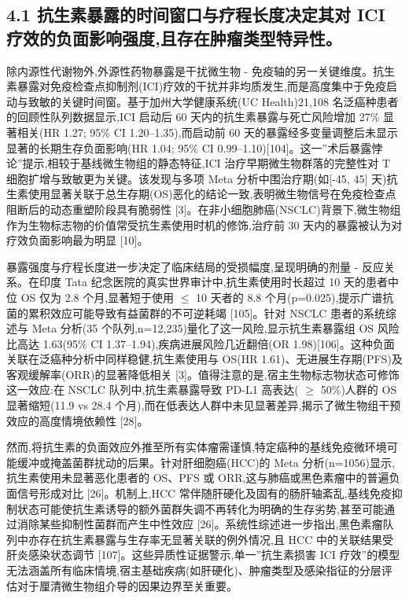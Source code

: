 \subsection{4.1 抗生素暴露的时间窗口与疗程长度决定其对 ICI 疗效的负面影响强度,且存在肿瘤类型特异性。}\label{ux6297ux751fux7d20ux66b4ux9732ux7684ux65f6ux95f4ux7a97ux53e3ux4e0eux7597ux7a0bux957fux5ea6ux51b3ux5b9aux5176ux5bf9-ici-ux7597ux6548ux7684ux8d1fux9762ux5f71ux54cdux5f3aux5ea6ux4e14ux5b58ux5728ux80bfux7624ux7c7bux578bux7279ux5f02ux6027}

除内源性代谢物外,外源性药物暴露是干扰微生物 - 免疫轴的另一关键维度。抗生素暴露对免疫检查点抑制剂(ICI)疗效的干扰并非均质发生,而是高度集中于免疫启动与致敏的关键时间窗。基于加州大学健康系统(UC Health)21,108 名泛癌种患者的回顾性队列数据显示,ICI 启动后 60 天内的抗生素暴露与死亡风险增加 27\% 显著相关(HR 1.27; 95\% CI 1.20--1.35),而启动前 60 天的暴露经多变量调整后未显示显著的长期生存负面影响(HR 1.04; 95\% CI 0.99--1.10){[}104{]}。这一''术后暴露悖论''提示,相较于基线微生物组的静态特征,ICI 治疗早期微生物群落的完整性对 T 细胞扩增与致敏更为关键。该发现与多项 Meta 分析中围治疗期(如{[}-45, 45{]} 天)抗生素使用显著关联于总生存期(OS)恶化的结论一致,表明微生物信号在免疫检查点阻断后的动态重塑阶段具有脆弱性 {[}3{]}。在非小细胞肺癌(NSCLC)背景下,微生物组作为生物标志物的价值常受抗生素使用时机的修饰,治疗前 30 天内的暴露被认为对疗效负面影响最为明显 {[}10{]}。

暴露强度与疗程长度进一步决定了临床结局的受损幅度,呈现明确的剂量 - 反应关系。在印度 Tata 纪念医院的真实世界审计中,抗生素使用时长超过 10 天的患者中位 OS 仅为 2.8 个月,显著短于使用 \(\leq\) 10 天者的 8.8 个月(p=0.025),提示广谱抗菌的累积效应可能导致有益菌群的不可逆耗竭 {[}105{]}。针对 NSCLC 患者的系统综述与 Meta 分析(35 个队列,n=12,235)量化了这一风险,显示抗生素暴露组 OS 风险比高达 1.63(95\% CI 1.37--1.94),疾病进展风险几近翻倍(OR 1.98){[}106{]}。这种负面关联在泛癌种分析中同样稳健,抗生素使用与 OS(HR 1.61)、无进展生存期(PFS)及客观缓解率(ORR)的显著降低相关 {[}3{]}。值得注意的是,宿主生物标志物状态可修饰这一效应:在 NSCLC 队列中,抗生素暴露导致 PD-L1 高表达( \(\geq\) 50\%)人群的 OS 显著缩短(11.9 vs 28.4 个月),而在低表达人群中未见显著差异,揭示了微生物组干预效应的高度情境依赖性 {[}28{]}。

然而,将抗生素的负面效应外推至所有实体瘤需谨慎,特定癌种的基线免疫微环境可能缓冲或掩盖菌群扰动的后果。针对肝细胞癌(HCC)的 Meta 分析(n=1056)显示,抗生素使用未显著恶化患者的 OS、PFS 或 ORR,这与肺癌或黑色素瘤中的普遍负面信号形成对比 {[}26{]}。机制上,HCC 常伴随肝硬化及固有的肠肝轴紊乱,基线免疫抑制状态可能使抗生素诱导的额外菌群失调不再转化为明确的生存劣势,甚至可能通过消除某些抑制性菌群而产生中性效应 {[}26{]}。系统性综述进一步指出,黑色素瘤队列中亦存在抗生素暴露与生存率无显著关联的例外情况,且 HCC 中的关联结果受肝炎感染状态调节 {[}107{]}。这些异质性证据警示,单一''抗生素损害 ICI 疗效''的模型无法涵盖所有临床情境,宿主基础疾病(如肝硬化)、肿瘤类型及感染指征的分层评估对于厘清微生物组介导的因果边界至关重要。

